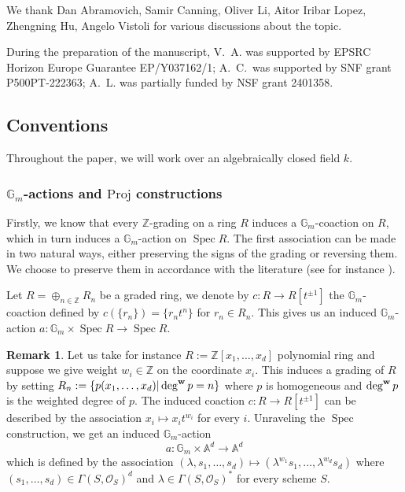 \documentclass[12pt]{amsart}
\newcommand\spec{\operatorname{Spec}}
\newcommand\Gm{\mathbb{G}_m}
\newcommand\Proj{\text{Proj}}
\newcommand\A{\mathbb{A}}
\newcommand\Z{\mathbb{Z}}
\newcommand{\sO}{\mathscr{O}}
\theoremstyle{definition}
\newtheorem{Rmk}[theorem]{Remark}
\begin{document}
We thank Dan Abramovich, Samir Canning, Oliver Li, Aitor Iribar Lopez, Zhengning Hu, Angelo Vistoli for various discussions about the topic.

During the preparation of the manuscript, V.~A. was supported by EPSRC Horizon Europe Guarantee EP/Y037162/1; A.~C.\ was supported by SNF grant P500PT-222363; A.~L. was partially funded by NSF grant 2401358.

\subsection{Conventions}\label{conventions}
Throughout the paper, we will work over an algebraically closed field $k$.

\subsubsection{$\Gm$-actions and $\Proj$ constructions}

Firstly, we know that every $\Z$-grading on a ring $R$ induces a $\Gm$-coaction on $R$, which in turn induces a $\Gm$-action on $\spec R$. The first association can be made in two natural ways, either preserving the signs of the grading or reversing them. We choose to preserve them in accordance with the literature (see for instance \cite[Section~1.1]{quek-rydh-weighted-blowup}).

Let $R=\oplus_{n\in \Z} R_n$ be a graded ring, we denote by $c:R\rightarrow R[t^{\pm 1}]$ the $\Gm$-coaction defined by $c(\{r_n\})=\{r_nt^n\}$ for $r_n \in R_n$. This gives us an induced $\Gm$-action $a:\Gm \times \spec R \rightarrow \spec R$.

\begin{Rmk}
     Let us take for instance $R:= \Z[x_1,\dots,x_d]$ polynomial ring and suppose we give weight $w_i \in \Z$ on the coordinate $x_i$. This induces a grading of $R$ by setting $R_n:= \{ p(x_1,\dots,x_d) \vert \deg^{\bf{w}}p=n\}$
    where $p$ is homogeneous and $\deg^{\bf{w}}p$ is the weighted degree of $p$. The induced coaction $c:R\rightarrow R[t^{\pm 1}]$ can be described by the association $x_i\mapsto x_it^{w_i}$ for every $i$. Unraveling the $\spec $ construction, we get an induced $\Gm$-action 
    $$ a:\Gm \times \A^d \rightarrow \A^d$$
    which is defined by the association $(\lambda,s_1,\dots,s_d) \mapsto (\lambda^{w_1}s_1,\dots,\lambda^{w_d}s_d)$ where $(s_1,\dots, s_d) \in \Gamma(S,\sO_S)^d$ and $\lambda \in \Gamma(S,\sO_S)^*$ for every scheme $S$. 
\end{Rmk}
\end{document}
